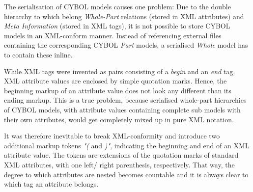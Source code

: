 The serialisation of CYBOL models causes one problem: Due to the double
hierarchy to which belong \emph{Whole-Part} relations (stored in XML attributes)
and \emph{Meta Information} (stored in XML tags), it is not possible to store
CYBOL models in an XML-conform manner. Instead of referencing external files
containing the corresponding CYBOL \emph{Part} models, a serialised
\emph{Whole} model has to contain these inline.

While XML tags were invented as pairs consisting of a \emph{begin} and an
\emph{end} tag, XML attribute values are enclosed by simple quotation marks.
Hence, the beginning markup of an attribute value does not look any different
than its ending markup. This is a true problem, because serialised whole-part
hierarchies of CYBOL models, with attribute values containing complete sub
models with their own attributes, would get completely mixed up in pure XML
notation.

It was therefore inevitable to break XML-conformity and introduce two
additional markup tokens \emph{"(} and \emph{)"}, indicating the beginning and
end of an XML attribute value. The tokens are extensions of the quotation marks
of standard XML attributes, with one left/ right parenthesis, respectively.
That way, the degree to which attributes are nested becomes countable and it is
always clear to which tag an attribute belongs.

